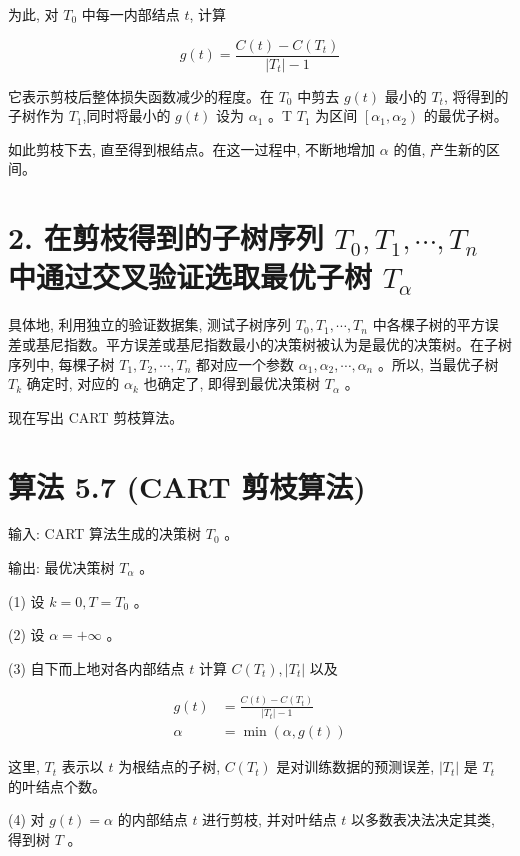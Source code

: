 \documentclass[10pt]{article}
\begin{document}
\begin{CJK*}{UTF8}{bsmi}
为此, 对 $T_{0}$ 中每一内部结点 $t$, 计算


\begin{equation*}
g(t)=\frac{C(t)-C\left(T_{t}\right)}{\left|T_{t}\right|-1} \tag{5.31}
\end{equation*}


它表示剪枝后整体损失函数减少的程度。在 $T_{0}$ 中剪去 $g(t)$ 最小的 $T_{t}$, 将得到的子树作为 $T_{1}$,同时将最小的 $g(t)$ 设为 $\alpha_{1}$ 。T $T_{1}$ 为区间 $\left[\alpha_{1}, \alpha_{2}\right)$ 的最优子树。

如此剪枝下去, 直至得到根结点。在这一过程中, 不断地增加 $\alpha$ 的值, 产生新的区间。

\section*{2. 在剪枝得到的子树序列 $T_{0}, T_{1}, \cdots, T_{n}$ 中通过交叉验证选取最优子树 $T_{\alpha}$}
具体地, 利用独立的验证数据集, 测试子树序列 $T_{0}, T_{1}, \cdots, T_{n}$ 中各棵子树的平方误差或基尼指数。平方误差或基尼指数最小的决策树被认为是最优的决策树。在子树序列中, 每棵子树 $T_{1}, T_{2}, \cdots, T_{n}$ 都对应一个参数 $\alpha_{1}, \alpha_{2}, \cdots, \alpha_{n}$ 。所以, 当最优子树 $T_{k}$ 确定时, 对应的 $\alpha_{k}$ 也确定了, 即得到最优决策树 $T_{\alpha}$ 。

现在写出 CART 剪枝算法。

\section*{算法 5.7 (CART 剪枝算法)}
输入: CART 算法生成的决策树 $T_{0}$ 。

输出: 最优决策树 $T_{\alpha}$ 。

(1) 设 $k=0, T=T_{0}$ 。

(2) 设 $\alpha=+\infty$ 。

(3) 自下而上地对各内部结点 $t$ 计算 $C\left(T_{t}\right),\left|T_{t}\right|$ 以及

$$
\begin{aligned}
g(t) & =\frac{C(t)-C\left(T_{t}\right)}{\left|T_{t}\right|-1} \\
\alpha & =\min (\alpha, g(t))
\end{aligned}
$$

这里, $T_{t}$ 表示以 $t$ 为根结点的子树, $C\left(T_{t}\right)$ 是对训练数据的预测误差, $\left|T_{t}\right|$ 是 $T_{t}$ 的叶结点个数。

(4) 对 $g(t)=\alpha$ 的内部结点 $t$ 进行剪枝, 并对叶结点 $t$ 以多数表决法决定其类, 得到树 $T$ 。


\end{CJK*}
\end{document}
